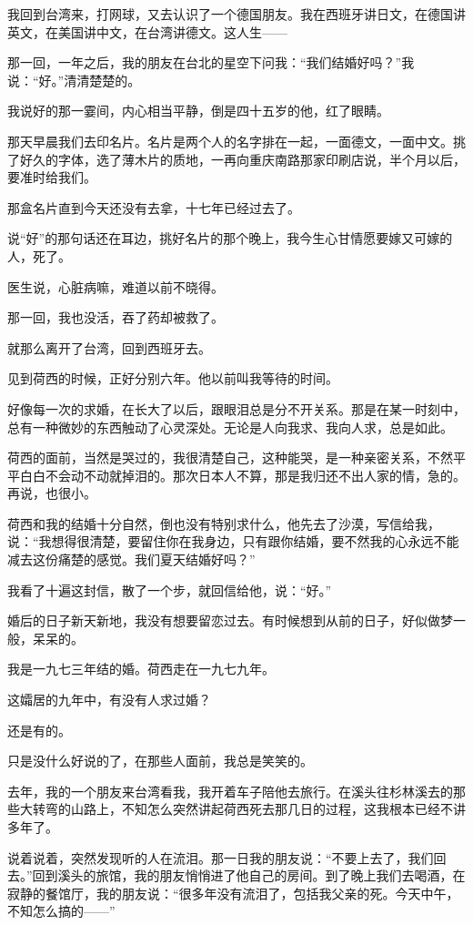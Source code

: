 \par 我回到台湾来，打网球，又去认识了一个德国朋友。我在西班牙讲日文，在德国讲英文，在美国讲中文，在台湾讲德文。这人生——
\par 那一回，一年之后，我的朋友在台北的星空下问我：“我们结婚好吗？”我说：“好。”清清楚楚的。
\par 我说好的那一霎间，内心相当平静，倒是四十五岁的他，红了眼睛。
\par 那天早晨我们去印名片。名片是两个人的名字排在一起，一面德文，一面中文。挑了好久的字体，选了薄木片的质地，一再向重庆南路那家印刷店说，半个月以后，要准时给我们。
\par 那盒名片直到今天还没有去拿，十七年已经过去了。
\par 说“好”的那句话还在耳边，挑好名片的那个晚上，我今生心甘情愿要嫁又可嫁的人，死了。
\par 医生说，心脏病嘛，难道以前不晓得。
\par 那一回，我也没活，吞了药却被救了。
\par 就那么离开了台湾，回到西班牙去。
\par 见到荷西的时候，正好分别六年。他以前叫我等待的时间。
\par 好像每一次的求婚，在长大了以后，跟眼泪总是分不开关系。那是在某一时刻中，总有一种微妙的东西触动了心灵深处。无论是人向我求、我向人求，总是如此。
\par 荷西的面前，当然是哭过的，我很清楚自己，这种能哭，是一种亲密关系，不然平平白白不会动不动就掉泪的。那次日本人不算，那是我归还不出人家的情，急的。再说，也很小。
\par 荷西和我的结婚十分自然，倒也没有特别求什么，他先去了沙漠，写信给我，说：“我想得很清楚，要留住你在我身边，只有跟你结婚，要不然我的心永远不能减去这份痛楚的感觉。我们夏天结婚好吗？”
\par 我看了十遍这封信，散了一个步，就回信给他，说：“好。”
\par 婚后的日子新天新地，我没有想要留恋过去。有时候想到从前的日子，好似做梦一般，呆呆的。
\par 我是一九七三年结的婚。荷西走在一九七九年。
\par 这孀居的九年中，有没有人求过婚？
\par 还是有的。
\par 只是没什么好说的了，在那些人面前，我总是笑笑的。
\par 去年，我的一个朋友来台湾看我，我开着车子陪他去旅行。在溪头往杉林溪去的那些大转弯的山路上，不知怎么突然讲起荷西死去那几日的过程，这我根本已经不讲多年了。
\par 说着说着，突然发现听的人在流泪。那一日我的朋友说：“不要上去了，我们回去。”回到溪头的旅馆，我的朋友悄悄进了他自己的房间。到了晚上我们去喝酒，在寂静的餐馆厅，我的朋友说：“很多年没有流泪了，包括我父亲的死。今天中午，不知怎么搞的——”
